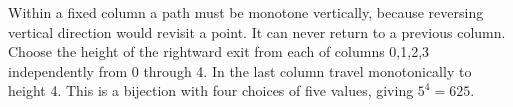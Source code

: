 Within a fixed column a path must be monotone vertically, because reversing vertical direction would revisit a point. It can never return to a previous column. Choose the height of the rightward exit from each of columns 0,1,2,3 independently from 0 through 4. In the last column travel monotonically to height 4. This is a bijection with four choices of five values, giving $\boxed{5^4=625}$.
